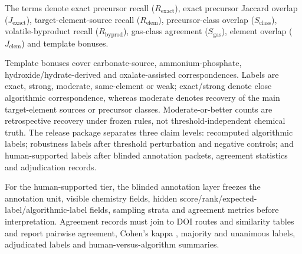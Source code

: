 \documentclass[11pt, letterpaper]{article}
\begin{document}
The terms denote exact precursor recall ($R_{\mathrm{exact}}$), exact precursor Jaccard overlap ($J_{\mathrm{exact}}$), target-element-source recall ($R_{\mathrm{elem}}$), precursor-class overlap ($S_{\mathrm{class}}$), volatile-byproduct recall ($R_{\mathrm{byprod}}$), gas-class agreement ($S_{\mathrm{gas}}$), element overlap ($J_{\mathrm{elem}}$) and template bonuses.

Template bonuses cover carbonate-source, ammonium-phosphate, hydroxide/hydrate-derived and oxalate-assisted correspondences. Labels are exact, strong, moderate, same-element or weak; exact/strong denote close algorithmic correspondence, whereas moderate denotes recovery of the main target-element sources or precursor classes. Moderate-or-better counts are retrospective recovery under frozen rules, not threshold-independent chemical truth. The release package separates three claim levels: recomputed algorithmic labels; robustness labels after threshold perturbation and negative controls; and human-supported labels after blinded annotation packets, agreement statistics and adjudication records.

For the human-supported tier, the blinded annotation layer freezes the annotation unit, visible chemistry fields, hidden score/rank/expected-label/algorithmic-label fields, sampling strata and agreement metrics before interpretation. Agreement records must join to DOI routes and similarity tables and report pairwise agreement, Cohen's kappa \cite{cohen1960agreement}, majority and unanimous labels, adjudicated labels and human-versus-algorithm summaries.
\end{document}

